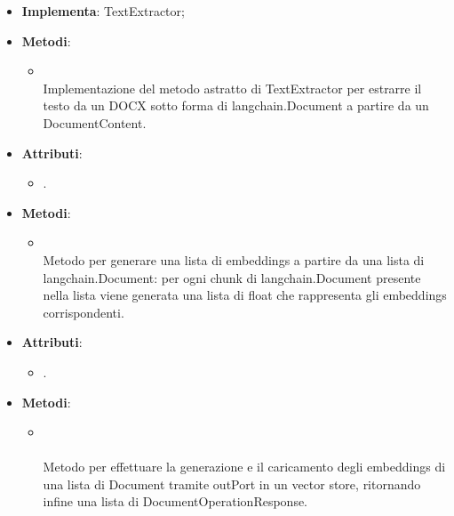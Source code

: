 \documentclass[10pt, a4paper]{article}
\begin{document}
\label{DOCXTextExtractorDettaglio}
\begin{itemize}
    \item \textbf{Implementa}: TextExtractor;
    \item \textbf{Metodi}:
    \begin{itemize}
        \item {}\\
        Implementazione del metodo astratto di TextExtractor per estrarre il testo da un DOCX sotto forma di langchain.Document a partire da un DocumentContent.
    \end{itemize}
\end{itemize}

\label{EmbeddingsCreatorDettaglio}
\begin{itemize}
    \item \textbf{Attributi}:
    \begin{itemize}
        \item {}.
    \end{itemize}
    \item \textbf{Metodi}:
    \begin{itemize}
        \item {}\\
        Metodo per generare una lista di embeddings a partire da una lista di langchain.Document: per ogni chunk di langchain.Document presente nella lista viene generata una lista di float che rappresenta gli embeddings corrispondenti.
    \end{itemize}
\end{itemize}

\label{EmbeddingsUploaderDettaglio}
\begin{itemize}
    \item \textbf{Attributi}:
    \begin{itemize}
        \item {}.
    \end{itemize}
    \item \textbf{Metodi}:
    \begin{itemize}
        \item {}\\ \\
        Metodo per effettuare la generazione e il caricamento degli embeddings di una lista di Document tramite outPort in un vector store, ritornando infine una lista di DocumentOperationResponse.
    \end{itemize}
\end{itemize}
\end{document}
